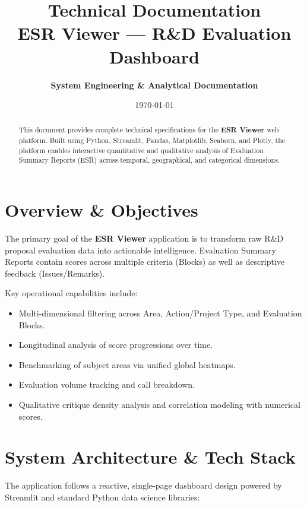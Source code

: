 \documentclass[11pt, a4paper]{article}
\title{\Huge\bfseries\color{primary} Technical Documentation \\[0.3em] \Large ESR Viewer --- R\&D Evaluation Dashboard}
\author{\textbf{System Engineering \& Analytical Documentation}}
\date{\today}
\begin{document}
\maketitle

\begin{abstract}
This document provides complete technical specifications for the \textbf{ESR Viewer} web platform. Built using Python, Streamlit, Pandas, Matplotlib, Seaborn, and Plotly, the platform enables interactive quantitative and qualitative analysis of Evaluation Summary Reports (ESR) across temporal, geographical, and categorical dimensions.
\end{abstract}

\vspace{1.5em}

\section{Overview \& Objectives}

The primary goal of the \textbf{ESR Viewer} application is to transform raw R\&D proposal evaluation data into actionable intelligence. Evaluation Summary Reports contain scores across multiple criteria (Blocks) as well as descriptive feedback (Issues/Remarks).

Key operational capabilities include:
\begin{itemize}
    \item Multi-dimensional filtering across Area, Action/Project Type, and Evaluation Blocks.
    \item Longitudinal analysis of score progressions over time.
    \item Benchmarking of subject areas via unified global heatmaps.
    \item Evaluation volume tracking and call breakdown.
    \item Qualitative critique density analysis and correlation modeling with numerical scores.
\end{itemize}

\section{System Architecture \& Tech Stack}

The application follows a reactive, single-page dashboard design powered by Streamlit and standard Python data science libraries:
\end{document}
